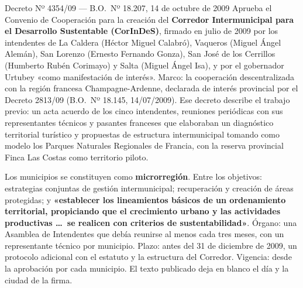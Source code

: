 \begin{ficha}{Decreto Nº 4354/09 --- B.O.\ Nº 18.207, 14 de octubre de 2009}
Aprueba el Convenio de Cooperación para la creación del \textbf{Corredor Intermunicipal para el Desarrollo Sustentable (CorInDeS)}, firmado en julio de 2009 por los intendentes de La Caldera (Héctor Miguel Calabró), Vaqueros (Miguel Ángel Alemán), San Lorenzo (Ernesto Fernando Gonza), San José de los Cerrillos (Humberto Rubén Corimayo) y Salta (Miguel Ángel Isa), y por el gobernador Urtubey «como manifestación de interés». Marco: la cooperación descentralizada con la región francesa Champagne-Ardenne, declarada de interés provincial por el Decreto 2813/09 (B.O.\ Nº 18.145, 14/07/2009). Ese decreto describe el trabajo previo: un acta acuerdo de los cinco intendentes, reuniones periódicas con sus representantes técnicos y pasantes franceses que elaboraban un diagnóstico territorial turístico y propuestas de estructura intermunicipal tomando como modelo los Parques Naturales Regionales de Francia, con la reserva provincial Finca Las Costas como territorio piloto.

Los municipios se constituyen como \textbf{microrregión}. Entre los objetivos: estrategias conjuntas de gestión intermunicipal; recuperación y creación de áreas protegidas; y \textbf{«establecer los lineamientos básicos de un ordenamiento territorial, propiciando que el crecimiento urbano y las actividades productivas \ldots\ se realicen con criterios de sustentabilidad»}. Órgano: una Asamblea de Intendentes que debía reunirse al menos cada tres meses, con un representante técnico por municipio. Plazo: antes del 31 de diciembre de 2009, un protocolo adicional con el estatuto y la estructura del Corredor. Vigencia: desde la aprobación por cada municipio. El texto publicado deja en blanco el día y la ciudad de la firma.
\end{ficha}

